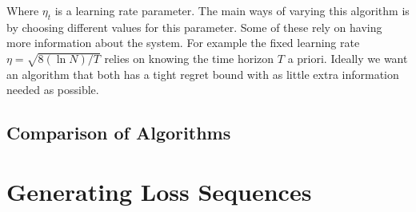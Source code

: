 \documentclass[10pt,a4paper]{article} %
\begin{document}
	Where $\eta_t$ is a learning rate parameter.  The main ways of varying this algorithm is by choosing different values for this parameter.  Some of these rely on having more information about the system.  For example the fixed learning rate $\eta = \sqrt{8 (\ln{N})/T}$ relies on knowing the time horizon $T$ a priori.  Ideally we want an algorithm that both has a tight regret bound with as little extra information needed as possible.
	
	\subsection{Comparison of Algorithms}
	
	\begin{table}[h!]
		\centering

		\label{tab:multicol}
	\end{table}

	\section{Generating Loss Sequences}
	
\end{document}
